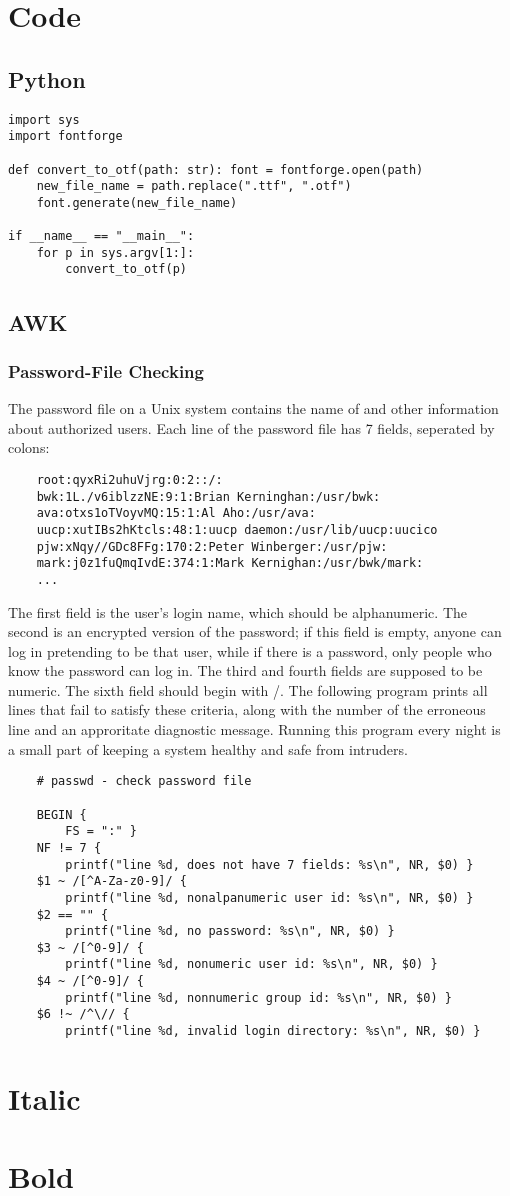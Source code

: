 \section{Code}
\subsection{Python}
\begin{verbatim}
import sys
import fontforge

def convert_to_otf(path: str): font = fontforge.open(path)
    new_file_name = path.replace(".ttf", ".otf")
    font.generate(new_file_name)

if __name__ == "__main__":
    for p in sys.argv[1:]:
        convert_to_otf(p)
\end{verbatim}

\subsection{AWK}
\subsubsection{Password-File Checking}
The password file on a Unix system contains the name of and other information
about authorized users. Each line of the password file has 7 fields, seperated
by colons:
\small\begin{verbatim}
    root:qyxRi2uhuVjrg:0:2::/:
    bwk:1L./v6iblzzNE:9:1:Brian Kerninghan:/usr/bwk:
    ava:otxs1oTVoyvMQ:15:1:Al Aho:/usr/ava:
    uucp:xutIBs2hKtcls:48:1:uucp daemon:/usr/lib/uucp:uucico
    pjw:xNqy//GDc8FFg:170:2:Peter Winberger:/usr/pjw:
    mark:j0z1fuQmqIvdE:374:1:Mark Kernighan:/usr/bwk/mark:
    ...
\end{verbatim}
\normalsize
The first field is the user's login name, which should be alphanumeric. The
second is an encrypted version of the password; if this field is empty, anyone
can log in pretending to be that user, while if there is a password, only
people who know the password can log in. The third and fourth fields are
supposed to be numeric. The sixth field should begin with /. The following
program prints all lines that fail to satisfy these criteria, along with the
number of the erroneous line and an approritate diagnostic message. Running
this program every night is a small part of keeping a system healthy and safe
from intruders.

\begin{verbatim}
    # passwd - check password file

    BEGIN {
        FS = ":" }
    NF != 7 {
        printf("line %d, does not have 7 fields: %s\n", NR, $0) }
    $1 ~ /[^A-Za-z0-9]/ {
        printf("line %d, nonalpanumeric user id: %s\n", NR, $0) }
    $2 == "" {
        printf("line %d, no password: %s\n", NR, $0) }
    $3 ~ /[^0-9]/ {
        printf("line %d, nonumeric user id: %s\n", NR, $0) }
    $4 ~ /[^0-9]/ {
        printf("line %d, nonnumeric group id: %s\n", NR, $0) }
    $6 !~ /^\// {
        printf("line %d, invalid login directory: %s\n", NR, $0) }
\end{verbatim}


\section{Italic}
\textit{\lipsum[2]}

\section{Bold}
\textbf{\lipsum[4]}

